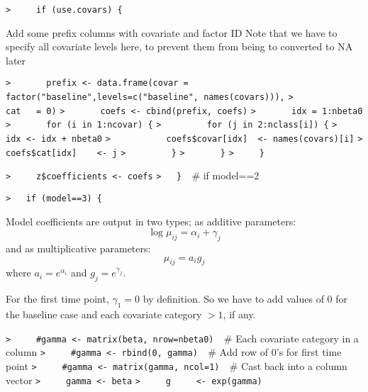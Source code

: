 \documentclass[a4paper]{article}
\begin{document}
\verb~>     if (use.covars) {~\par
Add some prefix columns with covariate and factor ID
Note that we have to specify all covariate levels here, to prevent them
from being to converted to NA later\par
\verb~>       prefix <- data.frame(covar = factor("baseline",levels=c("baseline", names(covars))),~\newline
\verb~>                            cat   = 0)~\newline
\verb~>       coefs <- cbind(prefix, coefs)~\newline
\verb~>       idx = 1:nbeta0~\newline
\verb~>       for (i in 1:ncovar) {~\newline
\verb~>         for (j in 2:nclass[i]) {~\newline
\verb~>           idx <- idx + nbeta0~\newline
\verb~>           coefs$covar[idx]  <- names(covars)[i]~\newline
\verb~>           coefs$cat[idx]    <- j~\newline
\verb~>         }~\newline
\verb~>       }~\newline
\verb~>     }~\par

\verb~>     z$coefficients <- coefs~\newline
\verb~>   }  ~{\sffamily\# if model==2}\par

\verb~>   if (model==3) {~\par
Model coefficients are output in two types; as additive parameters:
$$ \log\mu_{ij} = \alpha_i + \gamma_j $$
and as multiplicative parameters:
$$ \mu_{ij} = a_i g_j $$
where $a_i=e^{\alpha_i}$ and $g_j = e^{\gamma_j}$.\par

For the first time point, $\gamma_1=0$ by definition.
So we have to add values of 0 for the baseline case and each covariate category $>1$, if any.\par
\verb~>     #gamma <- matrix(beta, nrow=nbeta0)  ~{\sffamily\# Each covariate category in a column}\newline
\verb~>     #gamma <- rbind(0, gamma)  ~{\sffamily\# Add row of 0's for first time point}\newline
\verb~>     #gamma <- matrix(gamma, ncol=1)  ~{\sffamily\# Cast back into a column vector}\newline
\verb~>     gamma <- beta~\newline
\verb~>     g     <- exp(gamma)~\par
\end{document}
